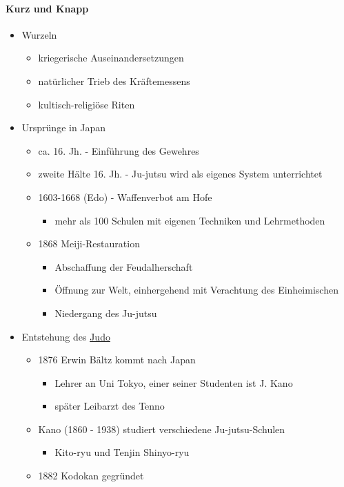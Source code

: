 \documentclass[justified, a4paper, notitlepage, captions=tableheading, nobib]{tufte-handout}
\begin{document}
\paragraph{Kurz und Knapp}
\label{sec:org661ebe8}
\begin{itemize}
\item Wurzeln
\begin{itemize}
\item kriegerische Auseinandersetzungen
\item natürlicher Trieb des Kräftemessens
\item kultisch-religiöse Riten
\end{itemize}
\item Ursprünge in Japan
\begin{itemize}
\item ca. 16. Jh. - Einführung des Gewehres
\item zweite Hälte 16. Jh. - Ju-jutsu wird als eigenes System unterrichtet
\item 1603-1668 (Edo) - Waffenverbot am Hofe
\begin{itemize}
\item mehr als 100 Schulen mit eigenen Techniken und Lehrmethoden
\end{itemize}
\item 1868 Meiji-Restauration
\begin{itemize}
\item Abschaffung der Feudalherschaft
\item Öffnung zur Welt, einhergehend mit Verachtung des Einheimischen
\item Niedergang des Ju-jutsu
\end{itemize}
\end{itemize}
\item Entstehung des \hyperref[org60aba15]{Judo}
\begin{itemize}
\item 1876 Erwin Bältz kommt nach Japan
\begin{itemize}
\item Lehrer an Uni Tokyo, einer seiner Studenten ist J. Kano
\item später Leibarzt des Tenno
\end{itemize}
\item Kano (1860 - 1938) studiert verschiedene Ju-jutsu-Schulen
\begin{itemize}
\item Kito-ryu und Tenjin Shinyo-ryu
\end{itemize}
\item 1882 Kodokan gegründet

\end{itemize}
\end{itemize}
\end{document}
